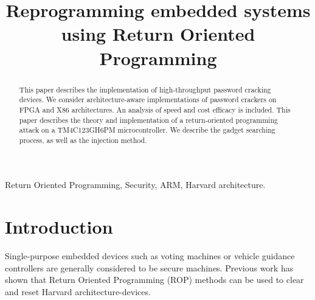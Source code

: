 


\title{Reprogramming embedded systems using Return Oriented Programming}

\author{
}

\maketitle


\begin{abstract}
This paper describes the implementation of high-throughput password cracking devices. We consider architecture-aware implementations of password crackers on FPGA and X86 architectures. An analysis of speed and cost efficacy is included. 
This paper describes the theory and implementation of a return-oriented programming attack on a TM4C123GH6PM microcontroller. We describe the gadget searching process, as well as the injection method. 


\end{abstract}

\begin{IEEEkeywords}
Return Oriented Programming, Security, ARM, Harvard architecture.
\end{IEEEkeywords}

\section{Introduction}
	Single-purpose embedded devices such as voting machines or vehicle guidance controllers are generally considered to be secure machines. Previous work has shown that Return Oriented Programming (ROP) methods can be used to clear and reset Harvard architecture-devices. %

